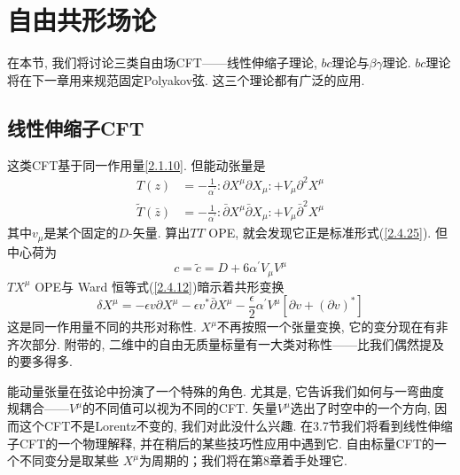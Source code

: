 \section{\texorpdfstring{自由共形场论}{2.5 Free CFTs}} \label{sec:2.5}
在本节, 我们将讨论三类自由场CFT——线性伸缩子理论, $bc$理论与$\beta\gamma$理论. $bc$理论将在下一章用来规范固定Polyakov弦. 这三个理论都有广泛的应用.

\subsection*{线性伸缩子CFT}

这类CFT基于同一作用量\eqref{2.1.10}. 但能动张量是
\begin{subequations} \label{2.5.1}
\begin{align}
T(z)&=-\frac{1}{\alpha^{\prime}}: \mathrel{\partial X^{\mu} \partial X_{\mu}}:+ V_{\mu} \partial^{2} X^{\mu} \label{2.5.1a} \\
\tilde{T}(\bar{z})&=-\frac{1}{\alpha^{\prime}}: \mathrel{\bar{\partial} X^{\mu} \bar{\partial} X_{\mu}}:+V_{\mu} \bar{\partial}^{2} X^{\mu}
\label{2.5.1b}
\end{align}
\end{subequations}
其中$v_\mu$是某个固定的$D$-矢量. 算出$TT$ OPE, 就会发现它正是标准形式(\ref{2.4.25}). 但中心荷为
\begin{equation}
c=\tilde{c}=D+6 \alpha^{\prime} V_{\mu} V^{\mu}
\end{equation}
$TX^\mu $ OPE与 Ward 恒等式(\ref{2.4.12})暗示着共形变换
\begin{equation}
\delta X^{\mu}=-\epsilon v \partial X^{\mu}-\epsilon v^{*} \bar{\partial} X^{\mu}-\frac{\epsilon}{2} \alpha^{\prime} V^{\mu}\left[\partial v+(\partial v)^{*}\right]
\end{equation}
这是同一作用量不同的共形对称性. $X^\mu$不再按照一个张量变换, 它的变分现在有非齐次部分. 附带的, 二维中的自由无质量标量有一大类对称性——比我们偶然提及的要多得多. 

能动量张量在弦论中扮演了一个特殊的角色. 尤其是, 它告诉我们如何与一弯曲度规耦合——$V^\mu$的不同值可以视为不同的CFT. 矢量$V^\mu$选出了时空中的一个方向, 因而这个CFT不是Lorentz不变的, 我们对此没什么兴趣. 在3.7节我们将看到线性伸缩子CFT的一个物理解释, 并在稍后的某些技巧性应用中遇到它. 自由标量CFT的一个不同变分是取某些  $X^\mu$为周期的；我们将在第8章着手处理它.

